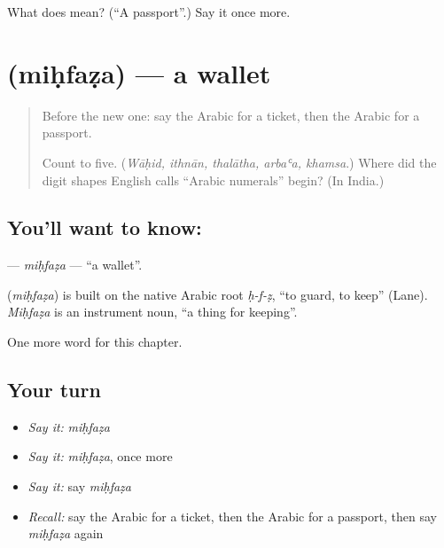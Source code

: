 \begin{tcolorbox}[breakable,colback=teal!4,colframe=teal!35!black,title={Before you move on}]
What does  mean? (\textquotedblleft{}A passport\textquotedblright{}.) Say it once more.
\end{tcolorbox}
\section[\texorpdfstring{\ar{محفظة} (miḥfaẓa)}{محفظة (miḥfaẓa)}]{ (miḥfaẓa) — a wallet}

\label{lesson:AR-C118-mihfaza}



\begin{quote}
Before the new one: say the Arabic for a ticket, then the Arabic for a passport.

Count to five. (\emph{Wāḥid, ithnān, thalātha, arbaʿa, khamsa}.) Where did the digit shapes English calls \textquotedblleft{}Arabic numerals\textquotedblright{} begin? (In India.)
\end{quote}

\subsection*{You'll want to know: }
\textbf{} — \emph{miḥfaẓa} — \textquotedblleft{}a wallet\textquotedblright{}.

\begin{cousinweb}
\textbf{} (\emph{miḥfaẓa}) is built on the native Arabic root \emph{ḥ-f-ẓ}, \textquotedblleft{}to guard, to keep\textquotedblright{} (Lane). \emph{Miḥfaẓa} is an instrument noun, \textquotedblleft{}a thing for keeping\textquotedblright{}.
\end{cousinweb}

\begin{grammarlens}[title={What you've built}]
One more word for this chapter.
\end{grammarlens}

\subsection*{Your turn}
\begin{itemize}
\raggedright
  \item \emph{Say it:} \emph{miḥfaẓa}
  \item \emph{Say it:} \emph{miḥfaẓa}, once more
  \item \emph{Say it:} say \emph{miḥfaẓa}
  \item \emph{Recall:} say the Arabic for a ticket, then the Arabic for a passport, then say \emph{miḥfaẓa} again
\end{itemize}

